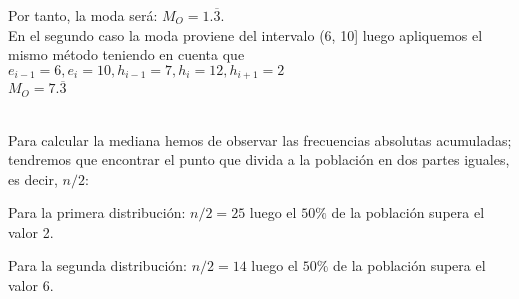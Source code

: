 Por tanto, la moda será: $M_O = 1.\overline{3}$.\\


En el segundo caso la moda proviene del intervalo (6, 10] luego apliquemos el mismo método teniendo en cuenta que $e_{i-1} = 6, e_i=10, h_{i-1} = 7, h_i = 12, h_{i+1} = 2 $ \\ 
$M_O = 7.\overline{3}$\\
\\

\subproblem

Para calcular la mediana hemos de observar las frecuencias absolutas acumuladas; tendremos que encontrar el punto que divida a la población en dos partes iguales, es decir, $n/2$:

Para la primera distribución: $n/2 = 25$ luego el $50\%$ de la población supera el valor 2.

Para la segunda distribución: $n/2 = 14$ luego el $50\%$ de la población supera el valor 6.\\
\\

\subproblem

